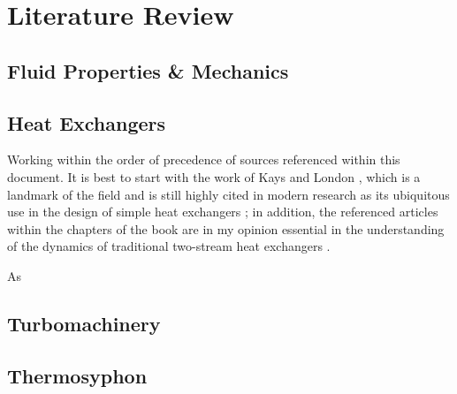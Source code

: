 \chapter{Literature Review}
\section{Fluid Properties \& Mechanics}
\section{Heat Exchangers}
Working within the order of precedence of sources referenced within this document. It is best to start with the work of Kays and London , which is a landmark of the field and is still highly cited in modern research as its ubiquitous use in the design of simple heat exchangers \cite{london-book}; in addition, the referenced articles within the chapters of the book are in my opinion essential in the understanding of the dynamics of traditional two-stream heat exchangers \cite{hx-london-singleFluid, hx-london-twoFluid, hx-dusinberre-numericalMethods}.

As \cite{hx-niroomand-twoPhase, hx-niroomand-multiFlow, hx-roessler-modularFramework}
\section{Turbomachinery}
\section{Thermosyphon}